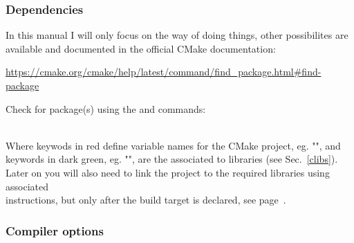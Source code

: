 \subsubsection*{Dependencies}
\label{cmake_deps}

In this manual I will only focus on the  way of doing things, other possibilites are available and documented in the official CMake documentation: 
\begin{center}\href{https://cmake.org/cmake/help/latest/command/find\_package.html\#find-package}{https://cmake.org/cmake/help/latest/command/find\_package.html\#find-package}\end{center}
Check for package(s) using the  and  commands: 
\begin{script}




\end{script}
\\[-0.25cm]
\noindent Where keywods in red define variable names for the CMake project, eg. "\texttt{}", 
and keywords in dark green, eg. "", are the associated to  libraries (see Sec.~\ref{clibs}). \\ 
Later on you will also need to link the project to the required libraries using associated \\
 instructions, but only after the build target is declared, see page~\pageref{clink}.

\subsubsection*{Compiler options}

